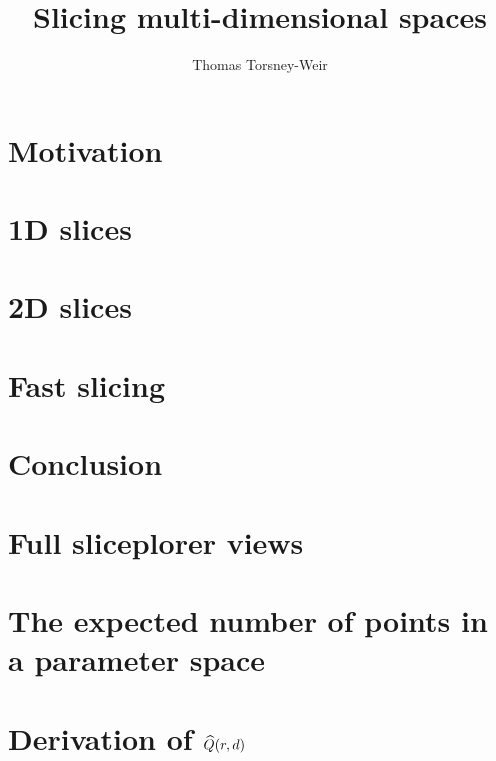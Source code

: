 \documentclass[a4paper,12pt]{memoir}
\title{Slicing multi-dimensional spaces}
\author{Thomas Torsney-Weir}
\date{}
\begin{document}
\DoubleSpacing

\maketitle

\listoffixmes



\tableofcontents
\listoffigures
\listoftables
\listofalgorithms

\chapter{Motivation}
\label{chp:motivation}


%

\chapter{1D slices}
\label{chp:sliceplorer}


\chapter{2D slices}
\label{chp:hypersliceplorer}


\chapter{Fast slicing}
\label{chp:rendering}


\chapter{Conclusion}
\label{chp:conclusion}


\begin{appendices}

\chapter{Full sliceplorer views}
\label{app:sliceplorer_ml}


\chapter{The expected number of points in a parameter space}
\label{app:exppts}


\chapter{Derivation of $\widehat{Q}(r,d)$}
\label{app:expfrags}


\end{appendices}
\end{document}
